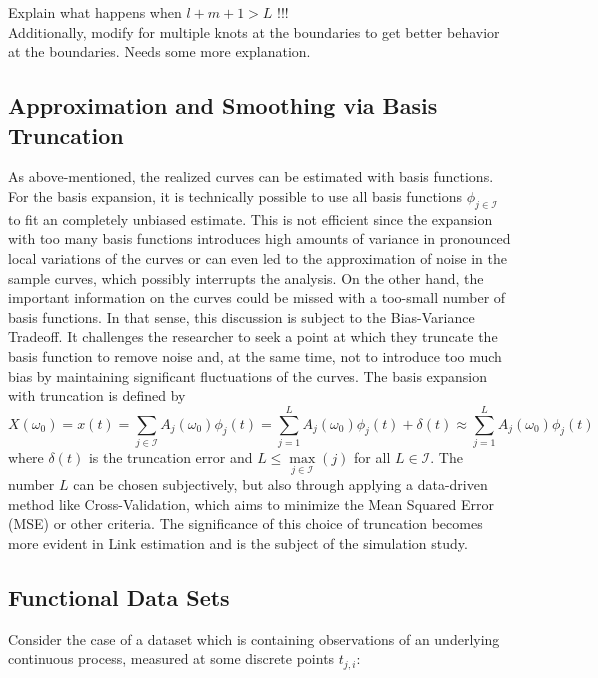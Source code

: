 \documentclass[11pt,twoside,a4paper]{article}
\begin{document}
	{\color{red}Explain what happens when $l+m+1 > L$ !!!\\
		Additionally, modify for multiple knots at the boundaries to get better behavior at the boundaries. Needs some more explanation.}	
	
	\subsection{Approximation and Smoothing via Basis Truncation}
	As above-mentioned, the realized curves can be estimated with basis functions. For the basis expansion, it is technically possible to use all basis functions $\phi_{j \in \mathcal{I}}$ to fit an completely unbiased estimate. This is not efficient since the expansion with too many basis functions introduces high amounts of variance in pronounced local variations of the curves or can even led to the approximation of noise in the sample curves, which possibly interrupts the analysis. On the other hand, the important information on the curves could be missed with a too-small number of basis functions. In that sense, this discussion is subject to the Bias-Variance Tradeoff. It challenges the researcher to seek a point at which they truncate the basis function to remove noise and, at the same time, not to introduce too much bias by maintaining significant fluctuations of the curves. The basis expansion with truncation is defined by
	\begin{equation}
		X(\omega_0) = x(t) = \sum_{j \in \mathcal{I}} A_j(\omega_0) \phi_j(t) = \sum_{j = 1}^{L} A_j(\omega_0) \phi_j(t) + \delta(t) \approx \sum_{j = 1}^{L} A_j(\omega_0) \phi_j(t)
	\end{equation}
	where $\delta(t)$ is the truncation error and $L \leq \max\limits_{j \in \mathcal{I}}(j)$ for all $L \in \mathcal{I}$. The number $L$ can be chosen subjectively, but also through applying a data-driven method like Cross-Validation, which aims to minimize the Mean Squared Error (MSE) or other criteria. The significance of this choice of truncation becomes more evident in {\color{green} Link estimation} and is the subject of the simulation study.
	
	\subsection{Functional Data Sets}
	
	Consider the case of a dataset which is containing observations of an underlying continuous process, measured at some discrete points $t_{j,i}$: 
	
\end{document}
